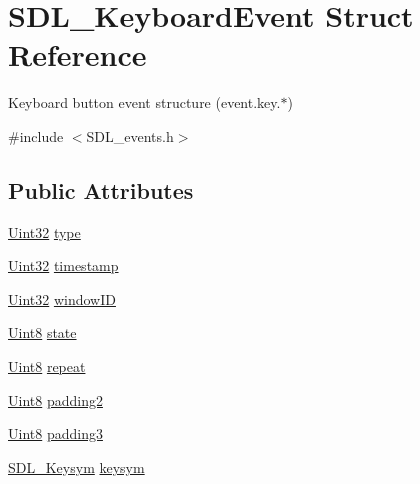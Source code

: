 \hypertarget{struct_s_d_l___keyboard_event}{}\section{S\+D\+L\+\_\+\+Keyboard\+Event Struct Reference}
\label{struct_s_d_l___keyboard_event}


Keyboard button event structure (event.\+key.$\ast$)  




{\ttfamily \#include $<$S\+D\+L\+\_\+events.\+h$>$}

\subsection*{Public Attributes}
\begin{DoxyCompactItemize}
\item 
\hyperlink{_s_d_l__stdinc_8h_add440eff171ea5f55cb00c4a9ab8672d}{Uint32} \hyperlink{struct_s_d_l___keyboard_event_ae0b2f2aace6f80c1f47e5a14350d409a}{type}
\item 
\hyperlink{_s_d_l__stdinc_8h_add440eff171ea5f55cb00c4a9ab8672d}{Uint32} \hyperlink{struct_s_d_l___keyboard_event_a3da1d8f6892e7f6ee28d9eafdb5e7d02}{timestamp}
\item 
\hyperlink{_s_d_l__stdinc_8h_add440eff171ea5f55cb00c4a9ab8672d}{Uint32} \hyperlink{struct_s_d_l___keyboard_event_a56efb6780b96acd5b50d8f797efb3546}{window\+ID}
\item 
\hyperlink{_s_d_l__stdinc_8h_a2944638813a090aa23e62f4da842c3e2}{Uint8} \hyperlink{struct_s_d_l___keyboard_event_a110558eb96c113c86cfa31a7018c2346}{state}
\item 
\hyperlink{_s_d_l__stdinc_8h_a2944638813a090aa23e62f4da842c3e2}{Uint8} \hyperlink{struct_s_d_l___keyboard_event_a3edac3b36304812d533795c9df4ed4c1}{repeat}
\item 
\hyperlink{_s_d_l__stdinc_8h_a2944638813a090aa23e62f4da842c3e2}{Uint8} \hyperlink{struct_s_d_l___keyboard_event_ae270122f757f76171318294afd2c95e6}{padding2}
\item 
\hyperlink{_s_d_l__stdinc_8h_a2944638813a090aa23e62f4da842c3e2}{Uint8} \hyperlink{struct_s_d_l___keyboard_event_ae1831035ef556a7b09efcd2469f26f7a}{padding3}
\item 
\hyperlink{struct_s_d_l___keysym}{S\+D\+L\+\_\+\+Keysym} \hyperlink{struct_s_d_l___keyboard_event_a2a57ba820a298f2c02ad5d41fd2b1aa8}{keysym}
\end{DoxyCompactItemize}


